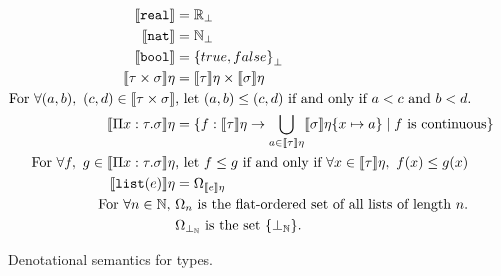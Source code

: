 \begin{figure}
 \begin{align*}
\llbracket \texttt{real} \rrbracket &= \mathbb{R}_{\perp} \\
\llbracket \texttt{nat} \rrbracket &= \mathbb{N}_{\perp} \\
 \llbracket \texttt{bool} \rrbracket &= {\{true, false\}}_{\perp} \\
 \llbracket \tau \times \sigma \rrbracket\eta &= \llbracket \tau \rrbracket\eta \times \llbracket \sigma \rrbracket\eta  \\
 \text{For } \forall (a, b), \ (c, d) \in \llbracket \tau \times \sigma \rrbracket &\text{, let }  (a,b) \leq (c,d) \text{ if and only if } a<c \text{ and } b<d. \\ 
 \llbracket \Pi x:\tau.\sigma \rrbracket\eta &= \{f: \llbracket \tau \rrbracket\eta \rightarrow 
 \bigcup_{a \in \llbracket \tau \rrbracket\eta} \llbracket \sigma \rrbracket\eta\{x \mapsto a\}
 \mid f \text{ is continuous}\} \\
 \text{ For } \forall f, \ g \in \llbracket \Pi x : \tau.\sigma \rrbracket\eta &\text{, let } f \leq g \text{ if and only if } \forall x \in 
 \llbracket \tau \rrbracket\eta, \ f(x) \leq g(x) \\
 \llbracket \texttt{list}(e) \rrbracket\eta &= \Omega_{\llbracket e \rrbracket\eta} \\
 \text{For } \forall n \in \mathbb{N}, \ &\Omega_n \text{ is the flat-ordered set of all lists of length } n. \\
 &\Omega_{\perp_{\mathbb{N}}} \text{ is the set } \{\perp_{\mathbb{N}}\}.
 \end{align*}
 \caption{Denotational semantics for types.}
 \end{figure}

